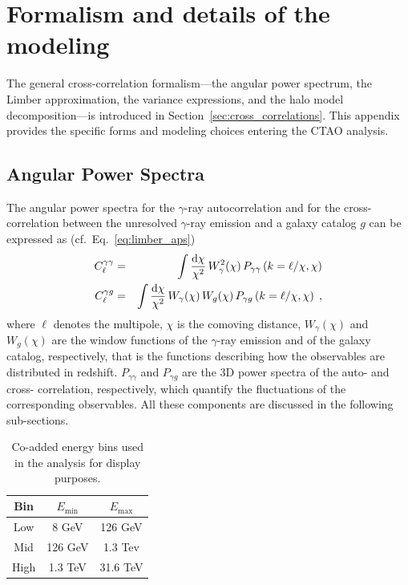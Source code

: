 \section{Formalism and details of the modeling}
\label{app:model}

The general cross-correlation formalism---the angular power spectrum, the Limber approximation, the variance expressions, and the halo model decomposition---is introduced in Section~\ref{sec:cross_correlations}. This appendix provides the specific forms and modeling choices entering the CTAO analysis.

\subsection{Angular Power Spectra}

The angular power spectra for the $\gamma$-ray autocorrelation and for the cross-correlation between the unresolved $\gamma$-ray emission and a galaxy catalog $g$ can be expressed as (cf.\ Eq.~\ref{eq:limber_aps}) \cite{Camera:2012cj,Camera_2015,Fornengo:2013rga}
\begin{eqnarray}
    \label{eq:auto}
     C_\ell^{\gamma \gamma} &=& \int \frac{\textrm{d}\chi}{\chi^2}\,W_{\gamma}^2(\chi)
 \,P_{\gamma \gamma}\left(k=\ell/\chi,\chi\right) \\
     C_\ell^{\gamma g} &=&\int \frac{\textrm{d}\chi}{\chi^2}\,W_{\gamma}(\chi)\, W_g(\chi)\,P_{\gamma g}\left(k=\ell/\chi,\chi\right) \; , \label{eq:cross}
 \end{eqnarray}
 where $\ell$ denotes the multipole, $\chi$ is the comoving distance, $W_{\gamma}(\chi)$ and $W_g(\chi)$ are the window functions of the $\gamma$-ray emission and of the galaxy catalog, respectively, that is the functions describing how the observables are distributed in redshift.  $P_{\gamma \gamma}$ and $P_{\gamma g}$ are the 3D power spectra of the auto- and cross- correlation, respectively, which quantify the fluctuations of the corresponding observables. All these components are discussed in the following sub-sections.


\begin{table}[t!]
\centering
\begin{tabular}{|c|cc|}
\hline
Bin & $E_\textrm{{min}}$ & $E_\textrm{{max}}$ \\
\hline
 Low & 8 GeV & 126 GeV \\  
 Mid & 126 GeV & 1.3 Tev \\
 High & 1.3 TeV & 31.6 TeV \\
\hline
  \end{tabular}
\caption{Co-added energy bins used in the analysis for display purposes.}
  \label{Tab:energybin}
\end{table}



